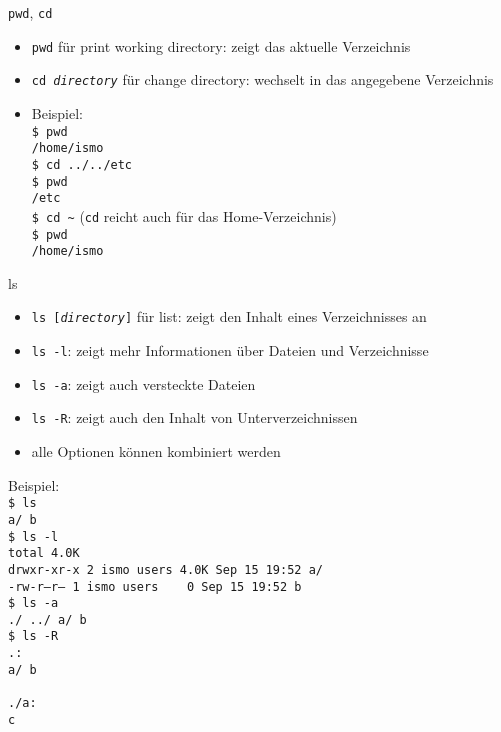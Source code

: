     \begin{frame}{\texttt{pwd}, \texttt{cd}}
      \begin{itemize}
        \item \texttt{pwd} für print working directory: zeigt das aktuelle Verzeichnis
        \item \texttt{cd \textit{directory}} für change directory: wechselt in das angegebene Verzeichnis
        \item Beispiel:\\
          \texttt{\$ pwd\\
                  /home/ismo\\
                  \$ cd ../../etc\\
                  \$ pwd\\
                  /etc\\
                  \$ cd \textasciitilde} (\texttt{cd} reicht auch für das Home-Verzeichnis) \\
          \texttt{\$ pwd\\
                  /home/ismo}
      \end{itemize}
    \end{frame}

    \begin{frame}{ls}
      \begin{itemize}
        \item \texttt{ls [\textit{directory}]} für list: zeigt den Inhalt eines Verzeichnisses an
        \item \texttt{ls -l}: zeigt mehr Informationen über Dateien und Verzeichnisse
        \item \texttt{ls -a}: zeigt auch versteckte Dateien
        \item \texttt{ls -R}: zeigt auch den Inhalt von Unterverzeichnissen
        \item alle Optionen können kombiniert werden
      \end{itemize}
    \end{frame}

    \begin{frame}
      Beispiel:\\ 
      \texttt{\$ ls\\
              a/  b\\
              \$ ls -l\\
              total 4.0K\\
              drwxr-xr-x 2 ismo users 4.0K Sep 15 19:52 a/\\
              -rw-r--r-- 1 ismo users \ \ \ 0 Sep 15 19:52 b\\
              \$ ls -a\\
              ./  ../  a/  b\\
              \$ ls -R\\
              .:\\
              a/  b\\
              ~\\
              ./a:\\
              c}
    \end{frame}

